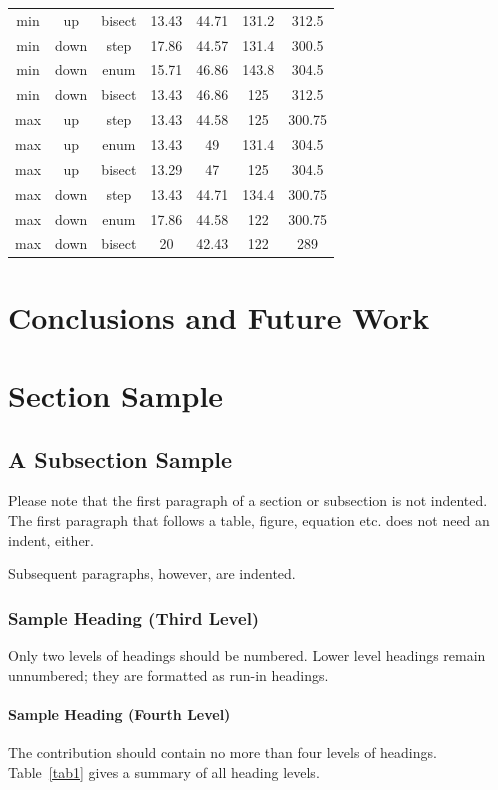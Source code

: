 \documentclass[runningheads]{llncs}
\begin{document}
\begin{table}
\begin{tabularx}{\textwidth}{|C|C|C|C|C|C|C|}
        min      & up   & bisect & 13.43 & 44.71 & 131.2  & 312.5  \\
        min      & down & step   & 17.86 & 44.57 & 131.4  & 300.5  \\
        min      & down & enum   & 15.71 & 46.86 & 143.8  & 304.5  \\
        min      & down & bisect & 13.43 & 46.86 & 125    & 312.5  \\
        max      & up   & step   & 13.43 & 44.58 & 125    & 300.75 \\
        max      & up   & enum   & 13.43 & 49    & 131.4  & 304.5  \\
        max      & up   & bisect & 13.29 & 47    & 125    & 304.5  \\
        max      & down & step   & 13.43 & 44.71 & 134.4  & 300.75 \\
        max      & down & enum   & 17.86 & 44.58 & 122    & 300.75 \\
        max      & down & bisect & 20    & 42.43 & 122    & 289    \\
        \hline
    \end{tabularx}
\end{table}

\section{Conclusions and Future Work}

\section{Section Sample}
\subsection{A Subsection Sample}
Please note that the first paragraph of a section or subsection is
not indented. The first paragraph that follows a table, figure,
equation etc. does not need an indent, either.

Subsequent paragraphs, however, are indented.

\subsubsection{Sample Heading (Third Level)} Only two levels of
headings should be numbered. Lower level headings remain unnumbered;
they are formatted as run-in headings.

\paragraph{Sample Heading (Fourth Level)}
The contribution should contain no more than four levels of
headings. Table~\ref{tab1} gives a summary of all heading levels.
\end{document}
